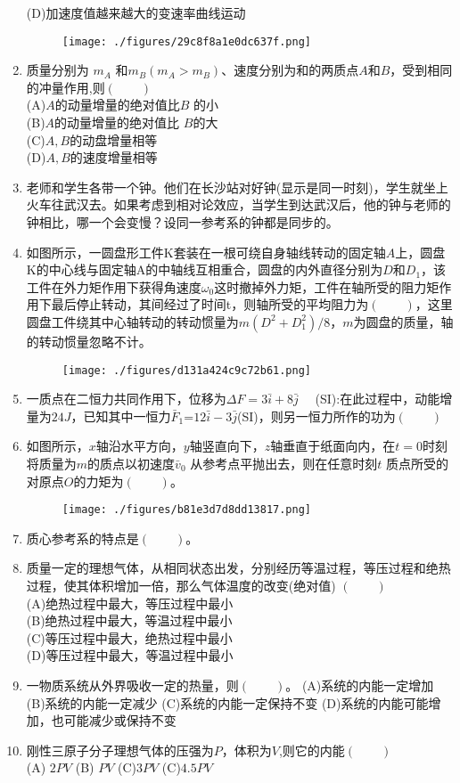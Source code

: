 \begin{enumerate}
(D)加速度值越来越大的变速率曲线运动
\begin{figure}[ht]
\centering
\texttt{[image: ./figures/29c8f8a1e0dc637f.png]}
\caption{} \label{fig_HSD15_5}
\end{figure}
\item 质量分别为 $m_A$ 和$m_B (m_A>m_B)$、速度分别为和的两质点$A$和$B$，受到相同的冲量作用,则$(\qquad)$\\
(A)$A$的动量增量的绝对值比$B$ 的小\\
(B)$A$的动量增量的绝对值比 $B$的大\\
(C)$A,B$的动盘增量相等\\
(D)$A,B$的速度增量相等
\item 老师和学生各带一个钟。他们在长沙站对好钟(显示是同一时刻)，学生就坐上火车往武汉去。如果考虑到相对论效应，当学生到达武汉后，他的钟与老师的钟相比，哪一个会变慢？设同一参考系的钟都是同步的。
\item 如图所示，一圆盘形工件K套装在一根可绕自身轴线转动的固定轴$A$上，圆盘K的中心线与固定轴A的中轴线互相重合，圆盘的内外直径分别为$D$和$D_1$，该工件在外力矩作用下获得角速度$\omega_0$这时撤掉外力矩，工件在轴所受的阻力矩作用下最后停止转动，其间经过了时间t，则轴所受的平均阻力为$(\qquad)$，这里圆盘工件绕其中心轴转动的转动惯量为$m(D^2+D^2_1)/8$，$m$为圆盘的质量，轴的转动惯量忽略不计。
\begin{figure}[ht]
\centering
\texttt{[image: ./figures/d131a424c9c72b61.png]}
\caption{} \label{fig_HSD15_4}
\end{figure}
\item 一质点在二恒力共同作用下，位移为$\Delta F=3\bar i +8\bar j \quad$ (SI):在此过程中，动能增量为$24J$，已知其中一恒力$\bar F_1$=$12 \bar i-3 \bar j$(SI)，则另一恒力所作的功为$(\qquad)$
\item 如图所示，$x$轴沿水平方向，$y$轴竖直向下，$z$轴垂直于纸面向内，在$t=0$时刻将质量为$m$的质点以初速度$\bar v_0$ 从参考点平抛出去，则在任意时刻$t$ 质点所受的对原点$O$的力矩为$(\qquad)$。
\begin{figure}[ht]
\centering
\texttt{[image: ./figures/b81e3d7d8dd13817.png]}
\caption{} \label{fig_HSD15_3}
\end{figure}
\item 质心参考系的特点是$(\qquad)$。
\item 质量一定的理想气体，从相同状态出发，分别经历等温过程，等压过程和绝热过程，使其体积增加一倍，那么气体温度的改变(绝对值) $(\qquad)$\\
(A)绝热过程中最大，等压过程中最小\\
(B)绝热过程中最大，等温过程中最小\\
(C)等压过程中最大，绝热过程中最小\\
(D)等压过程中最大，等温过程中最小
\item 一物质系统从外界吸收一定的热量，则$(\qquad)$。
(A)系统的内能一定增加
(B)系统的内能一定减少
(C)系统的内能一定保持不变
(D)系统的内能可能增加，也可能减少或保持不变
\item 刚性三原子分子理想气体的压强为$P$，体积为$V$,则它的内能$(\qquad)$\\
(A) $2PV$
(B) $PV$
(C)$3PV$
(C)$4.5PV$



\end{enumerate}
